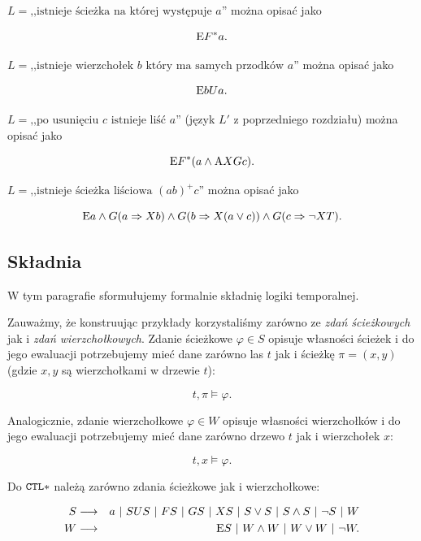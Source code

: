 \begin{przyklad}
	$L = \textrm{,,istnieje ścieżka na której występuje $a$''}$ można opisać jako

	$$\mathrm{E} F^*a.$$
\end{przyklad}

\begin{przyklad}
	$L = \textrm{,,istnieje wierzchołek $b$ który ma samych przodków $a$''}$ można opisać jako

	$$\mathrm{E} b U a.$$
\end{przyklad}

\begin{przyklad}
	$L = \textrm{,,po usunięciu $c$ istnieje liść $a$''}$ (język $L'$ z poprzedniego rozdziału) można opisać jako

	$$\mathrm{E} F^*(a \land \mathrm{A} XGc).$$
\end{przyklad}

\begin{przyklad}
	$L = \textrm{,,istnieje ścieżka liściowa $(ab)^{+}c$''}$ można opisać jako

	$$\mathrm{E} a \land G(a \Rightarrow Xb) \land G(b \Rightarrow X(a \lor c)) \land G(c \Rightarrow \neg X T).$$
\end{przyklad}


\subsection{Składnia} %
\label{sub:skladnia}

W tym paragrafie sformułujemy formalnie składnię logiki temporalnej.

Zauważmy, że konstruując przykłady korzystaliśmy zarówno ze \textit{zdań ścieżkowych} jak i \textit{zdań wierzchołkowych}. Zdanie ścieżkowe $\varphi \in S$ opisuje własności ścieżek i do jego ewaluacji potrzebujemy mieć dane zarówno las $t$ jak i ścieżkę $\pi = (x,y)$ (gdzie $x,y$ są wierzchołkami w drzewie $t$):

$$t, \pi \models \varphi.$$

Analogicznie, zdanie wierzchołkowe $\varphi \in W$ opisuje własności wierzchołków i do jego ewaluacji potrzebujemy mieć dane zarówno drzewo $t$ jak i wierzchołek $x$:

$$t, x \models \varphi.$$

Do $\mathtt{CTL*}$ należą zarówno zdania ścieżkowe jak i wierzchołkowe:

\begin{eqnarray*}
	S & \longrightarrow & a\ |\ SUS\ |\ FS\ |\ GS\ |\ XS\ |\ S \lor S\ |\ S \land S\ |\ \neg S\ |\ W \\
	W & \longrightarrow & \opE S\ |\ W \land W\ |\ W \lor W\ |\ \neg W.
\end{eqnarray*}

